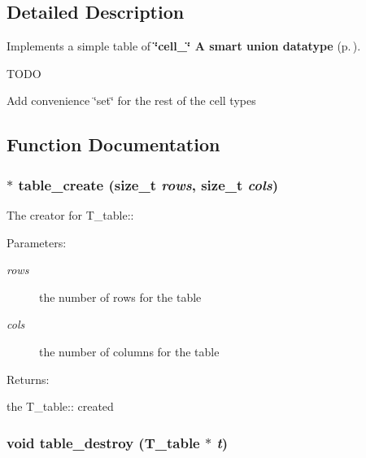 \subsection{Detailed Description}
Implements a simple table of {\bf \char`\"{}cell\_\-\char`\"{} A smart union datatype} {\rm (p.\,\pageref{group__table__cell})}.

TODO\begin{CompactItemize}
\item 
Add convenience \char`\"{}set\char`\"{} for the rest of the cell types \end{CompactItemize}


\subsection{Function Documentation}
\subsubsection{$\ast$ table\_\-create (size\_\-t {\em rows}, size\_\-t {\em cols})}\label{group__simple__table_a4}


The creator for T\_\-table::\begin{Desc}
\item[Parameters: ]\par
\begin{description}
\item[{\em 
rows}]the number of rows for the table \item[{\em 
cols}]the number of columns for the table \end{description}
\end{Desc}
\begin{Desc}
\item[Returns: ]\par
the T\_\-table:: created \end{Desc}
\subsubsection{\setlength{\rightskip}{0pt plus 5cm}void table\_\-destroy ({\bf T\_\-table} $\ast$ {\em t})}\label{group__simple__table_a5}


